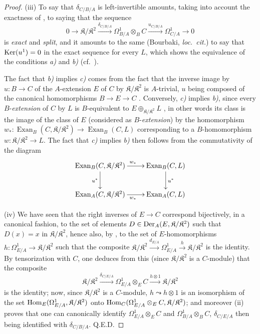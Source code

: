 \begin{proof}
\medskip
(iii) To say that $\delta_{C/B/A}$ is left-invertible amounts, taking into account the exactness of , to saying that the sequence
\begin{equation}
\tag{20.5.12.5}
  \label{0.20.5.12.5}
  0\to\mathfrak{K}/\mathfrak{K}^2\xrightarrow{\delta_{C/B/A}}\Omega^1_{B/A}\otimes_B C\xrightarrow{u_{C/B/A}}\Omega^1_{C/A}\to 0
\end{equation}
is \emph{exact} and \emph{split}, and it amounts to the same (Bourbaki, \emph{loc.\ cit.}) to say that $\operatorname{Ker}(u^1)=0$ in the exact sequence  for every $L$, which shows the equivalence of the conditions \emph{a)} and \emph{b)} (cf.\ ).

The fact that \emph{b)} implies \emph{c)} comes from the fact that the inverse image by $u:B\to C$ of the $A$-extension $E$ of $C$ by $\mathfrak{K}/\mathfrak{K}^2$ is $A$-trivial, $u$ being composed of the canonical homomorphisms $B\to E\to C$ .
Conversely, \emph{c)} implies \emph{b)}, since every $B$-\emph{extension} of $C$ by $L$ is $B$-equivalent to $E\oplus_{\mathfrak{K}/\mathfrak{K}^2}L$ , in other words its class is the image of the class of $E$ (considered as $B$-\emph{extension}) by the homomorphism
$w_*:\operatorname{Exan}_B(C,\mathfrak{K}/\mathfrak{K}^2)\to\operatorname{Exan}_B(C,L)$ corresponding to a $B$-homomorphism $w:\mathfrak{K}/\mathfrak{K}^2\to L$.
The fact that \emph{c)} implies \emph{b)} then follows from the commutativity of the diagram 
\[
\xymatrix{
  \operatorname{Exan}_B(C,\mathfrak{K}/\mathfrak{K}^2) \ar[r]^{w_*} \ar[d]_{u^*} & \operatorname{Exan}_B(C,L) \ar[d]^{u^*} \\
  \operatorname{Exan}_A(C,\mathfrak{K}/\mathfrak{K}^2) \ar[r]_{w_*} & \operatorname{Exan}_A(C,L)
}
\]

\medskip
(iv) We have seen  that the right inverses of $E\to C$ correspond bijectively, in a canonical fashion, to the set of elements $D\in\operatorname{Der}_A(E,\mathfrak{K}/\mathfrak{K}^2)$ such that $D(x)=x$ in $\mathfrak{K}/\mathfrak{K}^2$, hence also, by , to the set of $E$-homomorphisms $h:\Omega^1_{E/A}\to\mathfrak{K}/\mathfrak{K}^2$ such that the composite $\mathfrak{K}/\mathfrak{K}^2\xrightarrow{d_{E/A}}\Omega^1_{E/A}\xrightarrow{h}\mathfrak{K}/\mathfrak{K}^2$ is the identity.
By tensorization with $C$, one deduces from this (since $\mathfrak{K}/\mathfrak{K}^2$ is a $C$-module) that the composite
\[
  \mathfrak{K}/\mathfrak{K}^2\xrightarrow{\delta_{C/E/A}}\Omega^1_{E/A}\otimes_E C\xrightarrow{h\otimes 1}\mathfrak{K}/\mathfrak{K}^2
\]
is the identity; now, since $\mathfrak{K}/\mathfrak{K}^2$ is a $C$-module, $h\leadsto h\otimes 1$ is an isomorphism of the set $\operatorname{Hom}_E(\Omega^1_{E/A},\mathfrak{K}/\mathfrak{K}^2)$ onto $\operatorname{Hom}_C(\Omega^1_{E/A}\otimes_E C,\mathfrak{K}/\mathfrak{K}^2)$; and moreover (ii) proves that one can canonically identify $\Omega^1_{E/A}\otimes_E C$ and $\Omega^1_{B/A}\otimes_B C$, $\delta_{C/E/A}$ then being identified with $\delta_{C/B/A}$. Q.E.D.
\end{proof}

